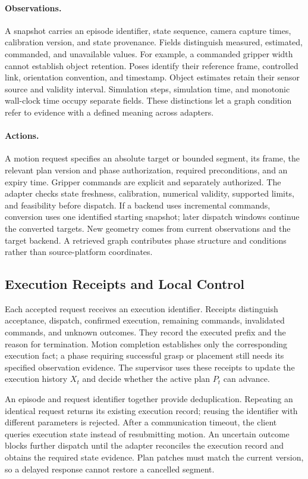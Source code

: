 \documentclass[10pt,twocolumn,letterpaper]{article}
\begin{document}
\paragraph{Observations.}
A snapshot carries an episode identifier, state sequence, camera capture times, calibration version, and state provenance. Fields distinguish measured, estimated, commanded, and unavailable values. For example, a commanded gripper width cannot establish object retention. Poses identify their reference frame, controlled link, orientation convention, and timestamp. Object estimates retain their sensor source and validity interval. Simulation steps, simulation time, and monotonic wall-clock time occupy separate fields. These distinctions let a graph condition refer to evidence with a defined meaning across adapters.

\paragraph{Actions.}
A motion request specifies an absolute target or bounded segment, its frame, the relevant plan version and phase authorization, required preconditions, and an expiry time. Gripper commands are explicit and separately authorized. The adapter checks state freshness, calibration, numerical validity, supported limits, and feasibility before dispatch. If a backend uses incremental commands, conversion uses one identified starting snapshot; later dispatch windows continue the converted targets. New geometry comes from current observations and the target backend. A retrieved graph contributes phase structure and conditions rather than source-platform coordinates.

\subsection{Execution Receipts and Local Control}

Each accepted request receives an execution identifier. Receipts distinguish acceptance, dispatch, confirmed execution, remaining commands, invalidated commands, and unknown outcomes. They record the executed prefix and the reason for termination. Motion completion establishes only the corresponding execution fact; a phase requiring successful grasp or placement still needs its specified observation evidence. The supervisor uses these receipts to update the execution history $X_t$ and decide whether the active plan $P_t$ can advance.

An episode and request identifier together provide deduplication. Repeating an identical request returns its existing execution record; reusing the identifier with different parameters is rejected. After a communication timeout, the client queries execution state instead of resubmitting motion. An uncertain outcome blocks further dispatch until the adapter reconciles the execution record and obtains the required state evidence. Plan patches must match the current version, so a delayed response cannot restore a cancelled segment.
\end{document}
